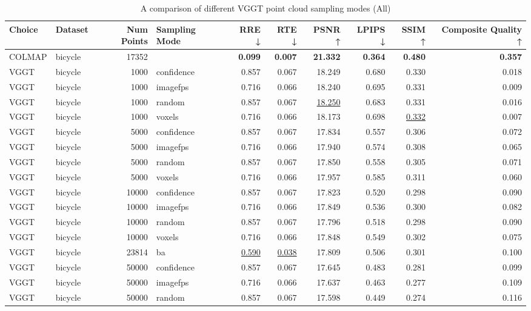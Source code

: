 \begin{table}[H]
\caption{A comparison of different VGGT point cloud sampling modes (All)}
\label{tab:03_sampling_mode_all}
\small
\begin{tabular}{llrlrrrrrr}
\toprule
Choice & Dataset & Num Points & Sampling Mode & RRE ↓ & RTE ↓ & PSNR ↑ & LPIPS ↓ & SSIM ↑ & Composite Quality ↑ \\
\midrule
COLMAP & bicycle & 17352 &  & \textbf{0.099} & \textbf{0.007} & \textbf{21.332} & \textbf{0.364} & \textbf{0.480} & \textbf{0.357} \\
VGGT & bicycle & 1000 & confidence & 0.857 & 0.067 & 18.249 & 0.680 & 0.330 & 0.018 \\
VGGT & bicycle & 1000 & imagefps & 0.716 & 0.066 & 18.240 & 0.695 & 0.331 & 0.009 \\
VGGT & bicycle & 1000 & random & 0.857 & 0.067 & \underline{18.250} & 0.683 & 0.331 & 0.016 \\
VGGT & bicycle & 1000 & voxels & 0.716 & 0.066 & 18.173 & 0.698 & \underline{0.332} & 0.007 \\
VGGT & bicycle & 5000 & confidence & 0.857 & 0.067 & 17.834 & 0.557 & 0.306 & 0.072 \\
VGGT & bicycle & 5000 & imagefps & 0.716 & 0.066 & 17.940 & 0.574 & 0.308 & 0.065 \\
VGGT & bicycle & 5000 & random & 0.857 & 0.067 & 17.850 & 0.558 & 0.305 & 0.071 \\
VGGT & bicycle & 5000 & voxels & 0.716 & 0.066 & 17.957 & 0.585 & 0.311 & 0.060 \\
VGGT & bicycle & 10000 & confidence & 0.857 & 0.067 & 17.823 & 0.520 & 0.298 & 0.090 \\
VGGT & bicycle & 10000 & imagefps & 0.716 & 0.066 & 17.849 & 0.536 & 0.300 & 0.082 \\
VGGT & bicycle & 10000 & random & 0.857 & 0.067 & 17.796 & 0.518 & 0.298 & 0.090 \\
VGGT & bicycle & 10000 & voxels & 0.716 & 0.066 & 17.848 & 0.549 & 0.302 & 0.075 \\
VGGT & bicycle & 23814 & ba & \underline{0.590} & \underline{0.038} & 17.809 & 0.506 & 0.301 & 0.100 \\
VGGT & bicycle & 50000 & confidence & 0.857 & 0.067 & 17.645 & 0.483 & 0.281 & 0.099 \\
VGGT & bicycle & 50000 & imagefps & 0.716 & 0.066 & 17.637 & 0.463 & 0.277 & 0.109 \\
VGGT & bicycle & 50000 & random & 0.857 & 0.067 & 17.598 & 0.449 & 0.274 & 0.116 \\

\end{tabular}
\end{table}
